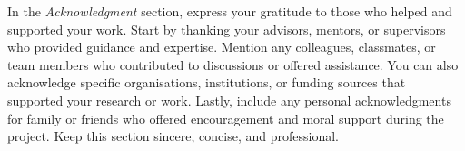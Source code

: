 
In the \textit{Acknowledgment} section, express your gratitude to those who helped and supported your work. Start by thanking your advisors, mentors, or supervisors who provided guidance and expertise. Mention any colleagues, classmates, or team members who contributed to discussions or offered assistance. You can also acknowledge specific organisations, institutions, or funding sources that supported your research or work. Lastly, include any personal acknowledgments for family or friends who offered encouragement and moral support during the project. Keep this section sincere, concise, and professional.

\plainblankpage